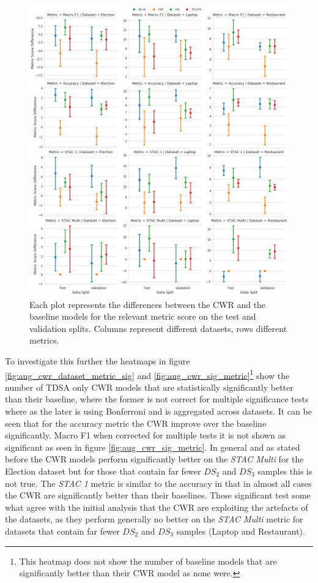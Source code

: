 \begin{figure}[!h]
    \centering
    \includegraphics[scale=0.3]{images/augmentation/methods_performance/CWR/overall_diff_cwr.png}
    \caption{Each plot represents the differences between the CWR and the baseline models for the relevant metric score on the test and validation splits. Columns represent different datasets, rows different metrics.}
    \label{fig:aug_overall_diff_cwr}
\end{figure}

To investigate this further the heatmaps in figure \ref{fig:aug_cwr_dataset_metric_sig} and \ref{fig:aug_cwr_sig_metric}\footnote{This heatmap does not show the number of baseline models that are significantly better than their CWR model as none were.} show the number of TDSA only CWR models that are statistically significantly better than their baseline, where the former is not correct for multiple significance tests where as the later is using Bonferroni and is aggregated across datasets. It can be seen that for the accuracy metric the CWR improve over the baseline significantly. Macro F1 when corrected for multiple tests it is not shown as significant as seen in figure \ref{fig:aug_cwr_sig_metric}. In general and as stated before the CWR models perform significantly better on the \textit{STAC Multi} for the Election dataset but for those that contain far fewer $DS_2$ and $DS_3$ samples this is not true. The \textit{STAC 1} metric is similar to the accuracy in that in almost all cases the CWR are significantly better than their baselines. These significant test some what agree with the initial analysis that the CWR are exploiting the artefacts of the datasets, as they perform generally no better on the \textit{STAC Multi} metric for datasets that contain far fewer $DS_2$ and $DS_3$ samples (Laptop and Restaurant).

